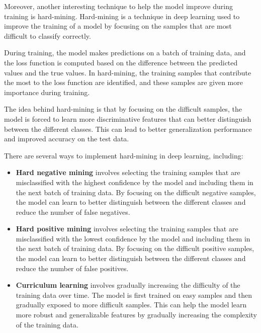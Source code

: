 Moreover, another interesting technique to help the model improve during training is hard-mining. Hard-mining is a technique in deep learning used to improve the training of a model by focusing on the samples that are most difficult to classify correctly.

During training, the model makes predictions on a batch of training data, and the loss function is computed based on the difference between the predicted values and the true values. In hard-mining, the training samples that contribute the most to the loss function are identified, and these samples are given more importance during training.

The idea behind hard-mining is that by focusing on the difficult samples, the model is forced to learn more discriminative features that can better distinguish between the different classes. This can lead to better generalization performance and improved accuracy on the test data.

There are several ways to implement hard-mining in deep learning, including:

\begin{itemize}
	
	\item \textbf{Hard negative mining} involves selecting the training samples that are misclassified with the highest confidence by the model and including them in the next batch of training data. By focusing on the difficult negative samples, the model can learn to better distinguish between the different classes and reduce the number of false negatives.
	
	\item \textbf{Hard positive mining} involves selecting the training samples that are misclassified with the lowest confidence by the model and including them in the next batch of training data. By focusing on the difficult positive samples, the model can learn to better distinguish between the different classes and reduce the number of false positives.
	
	\item \textbf{Curriculum learning} involves gradually increasing the difficulty of the training data over time. The model is first trained on easy samples and then gradually exposed to more difficult samples. This can help the model learn more robust and generalizable features by gradually increasing the complexity of the training data.

\end{itemize}

